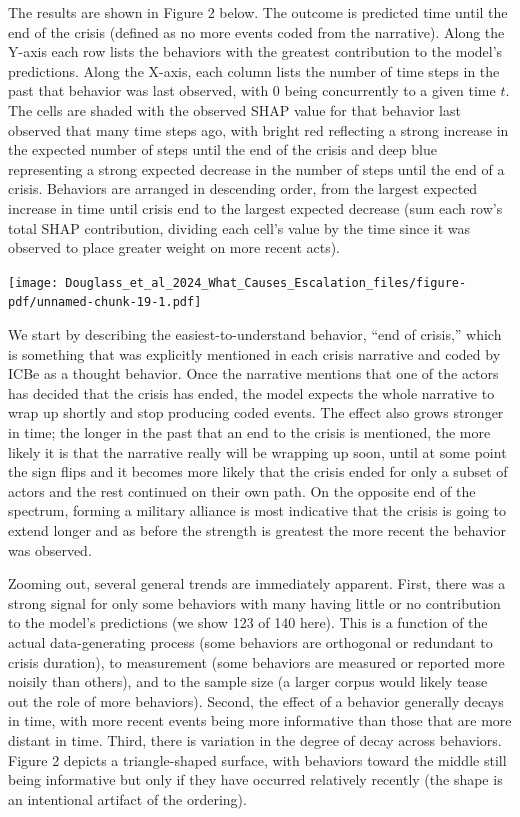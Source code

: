 \documentclass[
]{article}
\begin{document}
The results are shown in Figure 2 below. The outcome is predicted time
until the end of the crisis (defined as no more events coded from the
narrative). Along the Y-axis each row lists the behaviors with the
greatest contribution to the model's predictions. Along the X-axis, each
column lists the number of time steps in the past that behavior was last
observed, with 0 being concurrently to a given time \(t\). The cells are
shaded with the observed SHAP value for that behavior last observed that
many time steps ago, with bright red reflecting a strong increase in the
expected number of steps until the end of the crisis and deep blue
representing a strong expected decrease in the number of steps until the
end of a crisis. Behaviors are arranged in descending order, from the
largest expected increase in time until crisis end to the largest
expected decrease (sum each row's total SHAP contribution, dividing each
cell's value by the time since it was observed to place greater weight
on more recent acts).

\texttt{[image: Douglass\_et\_al\_2024\_What\_Causes\_Escalation\_files/figure-pdf/unnamed-chunk-19-1.pdf]}

We start by describing the easiest-to-understand behavior, ``end of
crisis,'' which is something that was explicitly mentioned in each
crisis narrative and coded by ICBe as a thought behavior. Once the
narrative mentions that one of the actors has decided that the crisis
has ended, the model expects the whole narrative to wrap up shortly and
stop producing coded events. The effect also grows stronger in time; the
longer in the past that an end to the crisis is mentioned, the more
likely it is that the narrative really will be wrapping up soon, until
at some point the sign flips and it becomes more likely that the crisis
ended for only a subset of actors and the rest continued on their own
path. On the opposite end of the spectrum, forming a military alliance
is most indicative that the crisis is going to extend longer and as
before the strength is greatest the more recent the behavior was
observed.

Zooming out, several general trends are immediately apparent. First,
there was a strong signal for only some behaviors with many having
little or no contribution to the model's predictions (we show 123 of 140
here). This is a function of the actual data-generating process (some
behaviors are orthogonal or redundant to crisis duration), to
measurement (some behaviors are measured or reported more noisily than
others), and to the sample size (a larger corpus would likely tease out
the role of more behaviors). Second, the effect of a behavior generally
decays in time, with more recent events being more informative than
those that are more distant in time. Third, there is variation in the
degree of decay across behaviors. Figure 2 depicts a triangle-shaped
surface, with behaviors toward the middle still being informative but
only if they have occurred relatively recently (the shape is an
intentional artifact of the ordering).
\end{document}
